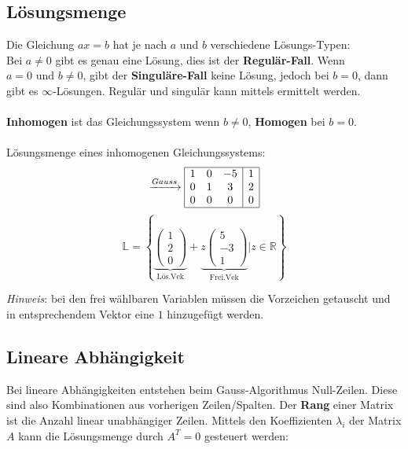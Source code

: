 \subsection{Lösungsmenge}
Die Gleichung $ax = b$ hat je nach $a$ und $b$ verschiedene Lösungs-Typen:\\ 
Bei $a \neq 0$ gibt es genau eine Lösung, dies ist der \textbf{Regulär-Fall}. Wenn $a = 0 \text{ und } b \neq 0$, gibt der \textbf{Singuläre-Fall} keine Lösung, jedoch bei $b = 0$, dann gibt es $\infty$-Lösungen. Regulär und singulär kann mittels \textit{} ermittelt werden.
\\ \\
\noindent\textbf{Inhomogen} ist das Gleichungssystem wenn $b \neq 0$, \textbf{Homogen} bei $b = 0$.
\\ \\
\noindent Lösungsmenge eines inhomogenen Gleichungssystems:
\[
\xrightarrow{Gauss}
\begin{array}{|ccc|c|}
	\hline
	1 & 0 & -5 & 1 \\
	0 & 1 & 3 & 2  \\
	0 & 0 & 0 & 0 \\
	\hline
\end{array}
\] 
\[
\mathbb{L} = \left\{
	\underbrace{
		\begin{pmatrix} 
			1 \\ 2 \\ 0 
		\end{pmatrix}
	}_{\text{Lös.Vek}}
	+
	\underbrace{
		z \begin{pmatrix} 
			5 \\ -3 \\ 1
		\end{pmatrix}
	}_{\text{Frei.Vek}}
	| z \in \mathbb{R}
\right\}
\]

\noindent\textit{Hinweis}: bei den frei wählbaren Variablen müssen die Vorzeichen getauscht und in entsprechendem Vektor eine $1$ hinzugefügt werden.

\subsection{Lineare Abhängigkeit}
Bei lineare Abhängigkeiten entstehen beim Gauss-Algorithmus Null-Zeilen. Diese sind also Kombinationen aus vorherigen Zeilen/Spalten. Der \textbf{Rang} einer Matrix ist die Anzahl linear unabhängiger Zeilen. Mittels den Koeffizienten $\lambda_i$ der Matrix $A$ kann die Lösungsmenge durch $A^T = 0$ gesteuert werden:

